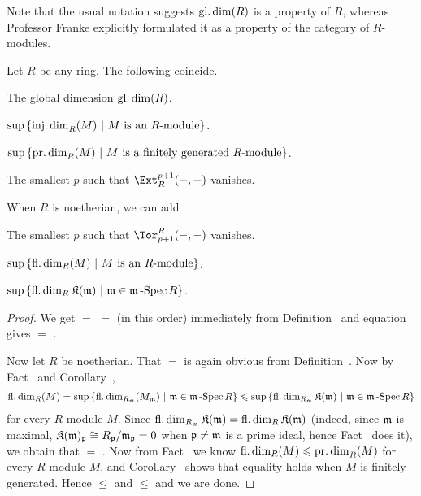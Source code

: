 \documentclass[a4paper,parskip=half,numbers=enddot, DIV=12]{scrreprt}
\renewcommand{\leq}{\leqslant}
\begin{document}
Note that the usual notation suggests $\operatorname{gl.dim}(R)$ is a property of $R$, whereas Professor Franke explicitly formulated it as a property of the category of $R$-modules.
\begin{cor}
	Let $R$ be any ring. The following coincide.
	\begin{alphanumerate}
		\item The global dimension $\operatorname{gl.dim}(R)$.
		\item $\sup\left\{\operatorname{inj.dim}_R(M)\ \middle|\  M\text{ is an }R\text{-module}\right\}$.
		\item $\sup\left\{\operatorname{pr.dim}_R(M)\ \middle|\  M\text{ is a finitely generated }R\text{-module}\right\}$.
		\item The smallest $p$ such that $\Ext_R^{p+1}(-,-)$ vanishes.
	\end{alphanumerate}
	When $R$ is noetherian, we can add 
	\begin{alphanumerate}\setcounter{enumi}{4}
		\item The smallest $p$ such that $\Tor_{p+1}^R(-,-)$ vanishes.
		\item $\sup\left\{\operatorname{fl.dim}_R(M)\ \middle|\  M\text{ is an }R\text{-module}\right\}$.
		\item $\sup\left\{\operatorname{fl.dim}_R\mathfrak{K}(\mathfrak{m})\ \middle|\ \mathfrak{m}\in\mathfrak{m}\operatorname{-Spec} R\right\}$.
	\end{alphanumerate}
\end{cor}
\begin{proof}
	We get  $=$  $=$  (in this order) immediately from Definition~ and equation  gives  $=$ .
	
	Now let $R$ be noetherian. That  $=$  is again obvious from Definition~. Now by Fact~ and Corollary~,
	\begin{align*}
	\fdim_R(M)=\sup\left\{\fdim_{R_\mm}(M_\mm)\st\mm\in\mSpec R\right\}\leq\sup\left\{\fdim_{R_\mm}\KK(\mm)\st\mm\in\mSpec R\right\}
	\end{align*}
	for every $R$-module $M$. Since $\operatorname{fl.dim}_{R_{\mathfrak{m}}}\mathfrak{K}(\mathfrak{m})=\operatorname{fl.dim}_R\mathfrak{K}(\mathfrak{m})$ (indeed, since $\mathfrak{m}$ is maximal, $\mathfrak{K}(\mathfrak{m})_{\mathfrak{p}}\cong R_{\mathfrak{p}}/\mathfrak{m}_{\mathfrak{p}}=0$ when $\mathfrak{p}\neq\mathfrak{m}$ is a prime ideal, hence Fact~ does it), we obtain that  $=$ . Now from Fact~ we know $\fdim_R(M)\leq \pdim_R(M)$ for every $R$-module $M$, and Corollary~ shows that equality holds when $M$ is finitely generated. Hence  $\leq$  and  $\leq$  and we are done.
\end{proof}
\end{document}
